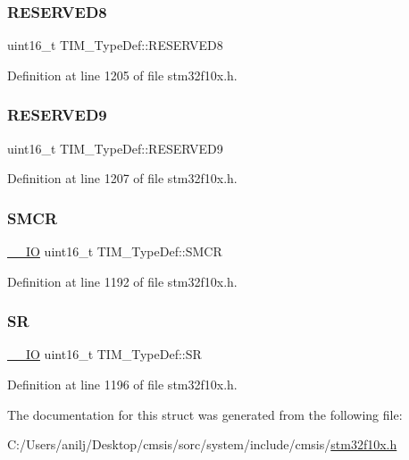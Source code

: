 \subsubsection{\texorpdfstring{R\+E\+S\+E\+R\+V\+E\+D8}{RESERVED8}}
{\footnotesize\ttfamily uint16\+\_\+t T\+I\+M\+\_\+\+Type\+Def\+::\+R\+E\+S\+E\+R\+V\+E\+D8}



Definition at line 1205 of file stm32f10x.\+h.

\mbox{\label{struct_t_i_m___type_def_a6754dd714ff0885e8e511977d2f393ce}} 
\subsubsection{\texorpdfstring{R\+E\+S\+E\+R\+V\+E\+D9}{RESERVED9}}
{\footnotesize\ttfamily uint16\+\_\+t T\+I\+M\+\_\+\+Type\+Def\+::\+R\+E\+S\+E\+R\+V\+E\+D9}



Definition at line 1207 of file stm32f10x.\+h.

\mbox{\label{struct_t_i_m___type_def_a476012f1b4567ffc21ded0b5fd50985e}} 
\subsubsection{\texorpdfstring{S\+M\+CR}{SMCR}}
{\footnotesize\ttfamily \hyperlink{core__sc300_8h_aec43007d9998a0a0e01faede4133d6be}{\+\_\+\+\_\+\+IO} uint16\+\_\+t T\+I\+M\+\_\+\+Type\+Def\+::\+S\+M\+CR}



Definition at line 1192 of file stm32f10x.\+h.

\mbox{\label{struct_t_i_m___type_def_af686e22c1792dc59dfeffe451d47cf13}} 
\subsubsection{\texorpdfstring{SR}{SR}}
{\footnotesize\ttfamily \hyperlink{core__sc300_8h_aec43007d9998a0a0e01faede4133d6be}{\+\_\+\+\_\+\+IO} uint16\+\_\+t T\+I\+M\+\_\+\+Type\+Def\+::\+SR}



Definition at line 1196 of file stm32f10x.\+h.



The documentation for this struct was generated from the following file\+:\begin{DoxyCompactItemize}
\item 
C\+:/\+Users/anilj/\+Desktop/cmsis/sorc/system/include/cmsis/\hyperlink{stm32f10x_8h}{stm32f10x.\+h}\end{DoxyCompactItemize}
